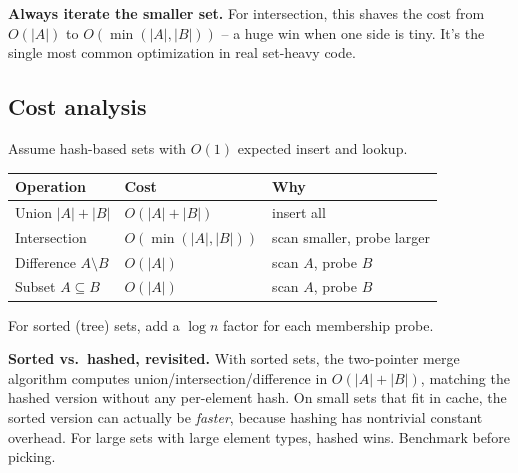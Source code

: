 \documentclass[11pt]{article}
\begin{document}
\begin{warnbox}
\textbf{Always iterate the smaller set.} For intersection, this shaves the cost from $O(|A|)$ to $O(\min(|A|, |B|))$ -- a huge win when one side is tiny. It's the single most common optimization in real set-heavy code.
\end{warnbox}

\subsection*{Cost analysis}

Assume hash-based sets with $O(1)$ expected insert and lookup.

\begin{center}
\begin{tabular}{lll}
\hline
Operation & Cost & Why \\
\hline
Union $|A| + |B|$ & $O(|A| + |B|)$ & insert all \\
Intersection & $O(\min(|A|, |B|))$ & scan smaller, probe larger \\
Difference $A \setminus B$ & $O(|A|)$ & scan $A$, probe $B$ \\
Subset $A \subseteq B$ & $O(|A|)$ & scan $A$, probe $B$ \\
\hline
\end{tabular}
\end{center}

For sorted (tree) sets, add a $\log n$ factor for each membership probe.

\begin{ideabox}
\textbf{Sorted vs.\ hashed, revisited.} With sorted sets, the two-pointer merge algorithm computes union/intersection/difference in $O(|A| + |B|)$, matching the hashed version without any per-element hash. On small sets that fit in cache, the sorted version can actually be \emph{faster}, because hashing has nontrivial constant overhead. For large sets with large element types, hashed wins. Benchmark before picking.
\end{ideabox}
\end{document}
